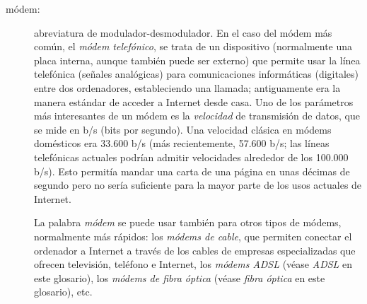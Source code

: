 \begin{description}
\item[módem:] abreviatura de modulador-desmodulador. En el caso del módem más común, el \emph{módem telefónico}, se trata de un dispositivo (normalmente una placa interna, aunque también puede ser externo) que permite usar la línea telefónica (señales analógicas) para comunicaciones informáticas (digitales) entre dos ordenadores, estableciendo una llamada; antiguamente era la manera estándar de acceder a Internet desde casa. Uno de los parámetros más interesantes de un módem es la \emph{velocidad} de transmisión de datos, que se mide en b/s (bits por segundo). Una velocidad clásica en módems domésticos era 33.600 b/s (más recientemente, 57.600 b/s; las líneas telefónicas actuales podrían admitir velocidades alrededor de los 100.000 b/s). Esto permitía mandar una carta de una página en unas décimas de segundo pero no sería suficiente para la mayor parte de los usos actuales de Internet. 

La palabra \emph{módem} se puede usar también para otros tipos de módems, normalmente más rápidos: los \emph{módems de cable}, que permiten conectar el ordenador a Internet a través de los cables de empresas especializadas que ofrecen televisión, teléfono e Internet, los \emph{módems ADSL} (véase \emph{ADSL} en este glosario), los \emph{módems de fibra óptica} (véase \emph{fibra óptica} en este glosario), etc. 


\end{description}
